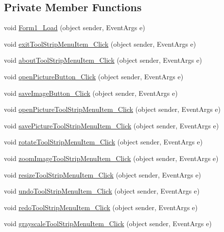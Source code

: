 \subsection*{Private Member Functions}
\begin{DoxyCompactItemize}
\item 
void \hyperlink{class_u_i_1_1_shopped_gui_ad9bcb5a3a89de53a6ef580bd806fae26}{Form1\_\-Load} (object sender, EventArgs e)
\item 
void \hyperlink{class_u_i_1_1_shopped_gui_a4c3239cc225d230bafb0cc53a9f49e2c}{exitToolStripMenuItem\_\-Click} (object sender, EventArgs e)
\item 
void \hyperlink{class_u_i_1_1_shopped_gui_a04958c8af963e508601e03e14bfb8bb8}{aboutToolStripMenuItem\_\-Click} (object sender, EventArgs e)
\item 
void \hyperlink{class_u_i_1_1_shopped_gui_a5a4be38d87e3d968e9336400e572b646}{openPictureButton\_\-Click} (object sender, EventArgs e)
\item 
void \hyperlink{class_u_i_1_1_shopped_gui_a205444f0fff14792394724b4eb22601d}{saveImageButton\_\-Click} (object sender, EventArgs e)
\item 
void \hyperlink{class_u_i_1_1_shopped_gui_a059988dec5a74fcc82ee2eb503d49118}{openPictureToolStripMenuItem\_\-Click} (object sender, EventArgs e)
\item 
void \hyperlink{class_u_i_1_1_shopped_gui_a79d60e553769283f7b9ec8af7a9d3dc1}{savePictureToolStripMenuItem\_\-Click} (object sender, EventArgs e)
\item 
void \hyperlink{class_u_i_1_1_shopped_gui_a8b4824c0552bcfe814bbf8437cb87ec2}{rotateToolStripMenuItem\_\-Click} (object sender, EventArgs e)
\item 
void \hyperlink{class_u_i_1_1_shopped_gui_a5f99b03c74d01734153873d6c35fbdf3}{zoomImageToolStripMenuItem\_\-Click} (object sender, EventArgs e)
\item 
void \hyperlink{class_u_i_1_1_shopped_gui_a05e2b57477f10f88b1ee06b6b5aa4d86}{resizeToolStripMenuItem\_\-Click} (object sender, EventArgs e)
\item 
void \hyperlink{class_u_i_1_1_shopped_gui_a167624483eae61dcbe7de755ad0549a5}{undoToolStripMenuItem\_\-Click} (object sender, EventArgs e)
\item 
void \hyperlink{class_u_i_1_1_shopped_gui_a5828d5deddf5b8453e01db469a1a6f83}{redoToolStripMenuItem\_\-Click} (object sender, EventArgs e)
\item 
void \hyperlink{class_u_i_1_1_shopped_gui_a9bfb029eb21eb1c7c4fddcee35d1d9fc}{grayscaleToolStripMenuItem\_\-Click} (object sender, EventArgs e)

\end{DoxyCompactItemize}

